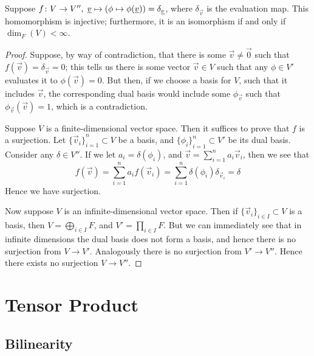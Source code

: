 \begin{theorem}
    Suppose \(f\colon V\to V'',\;\underline{v}\mapsto(\phi\mapsto\phi(\underline{v})) = \delta_{\underline{v}}\),
    where \(\delta_{\vec{v}}\) is the evaluation map.
    This homomorphism is injective;
    furthermore, it is an isomorphism if and only if \(\dim_F(V) < \infty\).
\end{theorem}
\begin{proof}
    Suppose, by way of contradiction, that there is some \(\vec{v} \neq \vec{0}\)
    such that \(f(\vec{v}) = \delta_{\vec{v}} = 0\);
    this tells us there is some vector \(\vec{v} \in V\)
    such that any \(\phi \in V'\) evaluates it to \(\phi(\vec{v}) = 0\).
    But then, if we choose a basis for \(V\), such that it includes \(\vec{v}\),
    the corresponding dual basis would include some \(\phi_{\vec{v}}\)
    such that \(\phi_{\vec{v}}(\vec{v}) = 1\), which is a contradiction.

    Suppose \(V\) is a finite-dimensional vector space.
    Then it suffices to prove that \(f\) is a surjection.
    Let \({\{\vec{v}_i\}}_{i=1}^n \subset V\) be a basis,
    and \({\{\phi_i\}}_{i=1}^n \subset V'\) be its dual basis.
    Consider any \(\delta \in V''\).
    If we let \(a_i = \delta(\phi_i)\),
    and \(\vec{v} = \sum_{i=1}^n a_i\vec{v}_i\),
    then we see that
    \begin{equation*}
        f(\vec{v}) = \sum_{i=1}^n a_i f(\vec{v}_i)
        = \sum_{i=1}^n \delta(\phi_i) \delta_{\vec{v}_i}
        = \delta
    \end{equation*}
    Hence we have surjection.

    Now suppose \(V\) is an infinite-dimensional vector space.
    Then if \({\{\vec{v}_i\}}_{i \in I} \subset V\) is a basis,
    then \(V = \bigoplus_{i \in I} F\),
    and \(V' = \prod_{i \in I} F\).
    But we can immediately see that in infinite dimensions the dual basis does not form a basis,
    and hence there is no surjection from \(V \to V'\).
    Analogously there is no surjection from \(V' \to V''\).
    Hence there exists no surjection \(V \to V''\).
\end{proof}


\section{Tensor Product}

\subsection*{Bilinearity}

